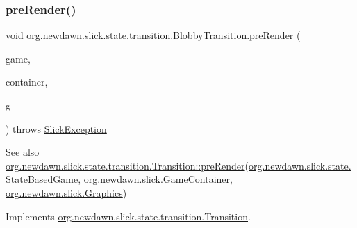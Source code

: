 \subsubsection{\texorpdfstring{pre\+Render()}{preRender()}}
{\footnotesize\ttfamily void org.\+newdawn.\+slick.\+state.\+transition.\+Blobby\+Transition.\+pre\+Render (\begin{DoxyParamCaption}\item[{\mbox{\hyperlink{classorg_1_1newdawn_1_1slick_1_1state_1_1_state_based_game}{State\+Based\+Game}}}]{game,  }\item[{\mbox{\hyperlink{classorg_1_1newdawn_1_1slick_1_1_game_container}{Game\+Container}}}]{container,  }\item[{\mbox{\hyperlink{classorg_1_1newdawn_1_1slick_1_1_graphics}{Graphics}}}]{g }\end{DoxyParamCaption}) throws \mbox{\hyperlink{classorg_1_1newdawn_1_1slick_1_1_slick_exception}{Slick\+Exception}}\hspace{0.3cm}{\ttfamily [inline]}}

\begin{DoxySeeAlso}{See also}
\mbox{\hyperlink{interfaceorg_1_1newdawn_1_1slick_1_1state_1_1transition_1_1_transition_ab8b0668c059830d938575d1a0b08bd93}{org.\+newdawn.\+slick.\+state.\+transition.\+Transition\+::pre\+Render}}(\mbox{\hyperlink{classorg_1_1newdawn_1_1slick_1_1state_1_1_state_based_game}{org.\+newdawn.\+slick.\+state.\+State\+Based\+Game}}, \mbox{\hyperlink{classorg_1_1newdawn_1_1slick_1_1_game_container}{org.\+newdawn.\+slick.\+Game\+Container}}, \mbox{\hyperlink{classorg_1_1newdawn_1_1slick_1_1_graphics}{org.\+newdawn.\+slick.\+Graphics}}) 
\end{DoxySeeAlso}


Implements \mbox{\hyperlink{interfaceorg_1_1newdawn_1_1slick_1_1state_1_1transition_1_1_transition_ab8b0668c059830d938575d1a0b08bd93}{org.\+newdawn.\+slick.\+state.\+transition.\+Transition}}.


